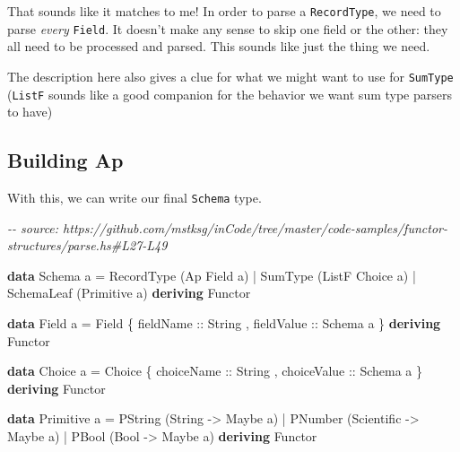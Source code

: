 \documentclass[]{article}
\newenvironment{Shaded}{}{}
\newcommand{\CommentTok}[1]{\textcolor[rgb]{0.38,0.63,0.69}{\textit{#1}}}
\newcommand{\DataTypeTok}[1]{\textcolor[rgb]{0.56,0.13,0.00}{#1}}
\newcommand{\KeywordTok}[1]{\textcolor[rgb]{0.00,0.44,0.13}{\textbf{#1}}}
\newcommand{\NormalTok}[1]{#1}
\newcommand{\OperatorTok}[1]{\textcolor[rgb]{0.40,0.40,0.40}{#1}}
\newcommand{\OtherTok}[1]{\textcolor[rgb]{0.00,0.44,0.13}{#1}}
\begin{document}
That sounds like it matches to me! In order to parse a \texttt{RecordType}, we
need to parse \emph{every} \texttt{Field}. It doesn't make any sense to skip one
field or the other: they all need to be processed and parsed. This sounds like
just the thing we need.

The description here also gives a clue for what we might want to use for
\texttt{SumType} (\texttt{ListF} sounds like a good companion for the behavior
we want sum type parsers to have)

\hypertarget{building-ap}{%
\subsection{Building Ap}\label{building-ap}}

With this, we can write our final \texttt{Schema} type.

\begin{Shaded}
\begin{Highlighting}[]
\CommentTok{{-}{-} source: https://github.com/mstksg/inCode/tree/master/code{-}samples/functor{-}structures/parse.hs\#L27{-}L49}

\KeywordTok{data} \DataTypeTok{Schema}\NormalTok{ a }\OtherTok{=}
      \DataTypeTok{RecordType}\NormalTok{  (}\DataTypeTok{Ap} \DataTypeTok{Field}\NormalTok{ a)}
    \OperatorTok{|} \DataTypeTok{SumType}\NormalTok{     (}\DataTypeTok{ListF} \DataTypeTok{Choice}\NormalTok{ a)}
    \OperatorTok{|} \DataTypeTok{SchemaLeaf}\NormalTok{  (}\DataTypeTok{Primitive}\NormalTok{ a)}
  \KeywordTok{deriving} \DataTypeTok{Functor}

\KeywordTok{data} \DataTypeTok{Field}\NormalTok{ a }\OtherTok{=} \DataTypeTok{Field}
\NormalTok{    \{}\OtherTok{ fieldName  ::} \DataTypeTok{String}
\NormalTok{    ,}\OtherTok{ fieldValue ::} \DataTypeTok{Schema}\NormalTok{ a}
\NormalTok{    \}}
  \KeywordTok{deriving} \DataTypeTok{Functor}

\KeywordTok{data} \DataTypeTok{Choice}\NormalTok{ a }\OtherTok{=} \DataTypeTok{Choice}
\NormalTok{    \{}\OtherTok{ choiceName  ::} \DataTypeTok{String}
\NormalTok{    ,}\OtherTok{ choiceValue ::} \DataTypeTok{Schema}\NormalTok{ a}
\NormalTok{    \}}
  \KeywordTok{deriving} \DataTypeTok{Functor}

\KeywordTok{data} \DataTypeTok{Primitive}\NormalTok{ a }\OtherTok{=}
      \DataTypeTok{PString}\NormalTok{ (}\DataTypeTok{String} \OtherTok{{-}>} \DataTypeTok{Maybe}\NormalTok{ a)}
    \OperatorTok{|} \DataTypeTok{PNumber}\NormalTok{ (}\DataTypeTok{Scientific} \OtherTok{{-}>} \DataTypeTok{Maybe}\NormalTok{ a)}
    \OperatorTok{|} \DataTypeTok{PBool}\NormalTok{   (}\DataTypeTok{Bool} \OtherTok{{-}>} \DataTypeTok{Maybe}\NormalTok{ a)}
  \KeywordTok{deriving} \DataTypeTok{Functor}
\end{Highlighting}
\end{Shaded}
\end{document}
